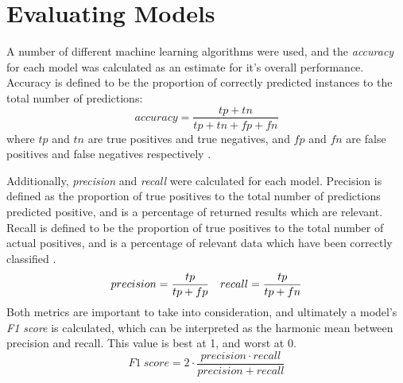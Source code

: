 \section{Evaluating Models} \label{evalmodels}

A number of different machine learning algorithms were used, and the \textit{accuracy} for each model was calculated as an estimate for it's overall performance. Accuracy is defined to be the proportion of correctly predicted instances to the total number of predictions:
$$
accuracy = \frac{tp+tn}{tp+tn+fp+fn}
$$
where $tp$ and $tn$ are true positives and true negatives, and $fp$ and $fn$ are false positives and false negatives respectively \cite{vanwinckelen2012estimating}.

Additionally, \textit{precision} and \textit{recall} were calculated for each model. Precision is defined as the proportion of true positives to the total number of predictions predicted positive, and is a percentage of returned results which are relevant. Recall is defined to be the proportion of true positives to the total number of actual positives, and is a percentage of relevant data which have been correctly classified \cite{buckland1994relationship}.
$$
precision = \frac{tp}{tp+fp} \\
\quad recall = \frac{tp}{tp+fn}
$$
Both metrics are important to take into consideration, and ultimately a model's \textit{F1 score} is calculated, which can be interpreted as the harmonic mean between precision and recall. This value is best at 1, and worst at 0.
$$
F1 \ score = 2 \cdot \frac{precision \cdot recall}{precision + recall}
$$

